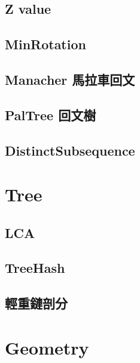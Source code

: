 \subsection{Z value}


\subsection{MinRotation}


\subsection{Manacher 馬拉車回文}


\subsection{PalTree 回文樹}


\subsection{DistinctSubsequence}

\section{Tree}

\subsection{LCA}


\subsection{TreeHash}


\subsection{輕重鏈剖分}

\section{Geometry}

